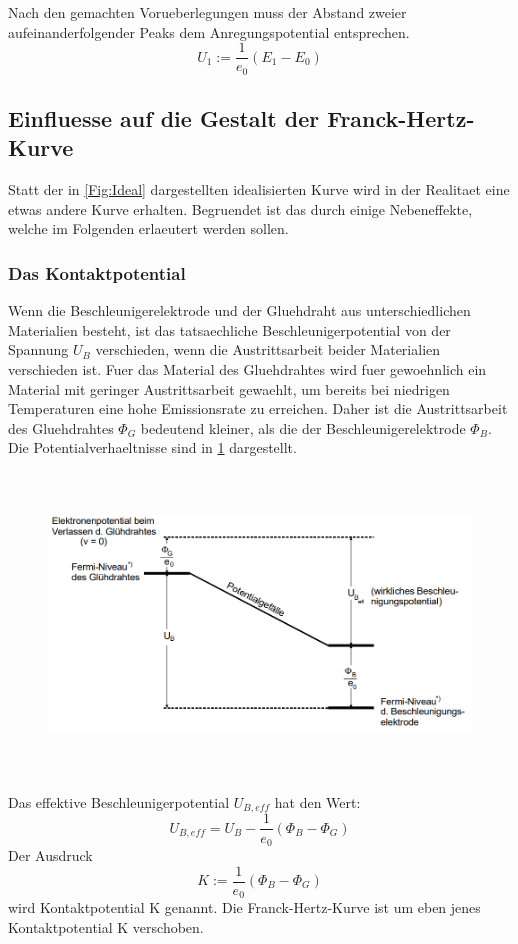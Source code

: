 Nach den gemachten Vorueberlegungen muss der Abstand zweier aufeinanderfolgender Peaks dem Anregungspotential entsprechen.
\begin{equation}
    U_1:=\frac{1}{e_0}(E_1-E_0)
\end{equation}
\subsection{Einfluesse auf die Gestalt der Franck-Hertz-Kurve}
Statt der in \ref{Fig:Ideal} dargestellten idealisierten Kurve wird in der Realitaet eine etwas andere Kurve erhalten. Begruendet ist das durch einige Nebeneffekte, welche im Folgenden erlaeutert werden sollen.
\subsubsection{Das Kontaktpotential}
Wenn die Beschleunigerelektrode und der Gluehdraht aus unterschiedlichen Materialien besteht, ist das tatsaechliche Beschleunigerpotential von der Spannung $U_B$ verschieden, wenn die Austrittsarbeit beider Materialien verschieden ist. Fuer das Material des Gluehdrahtes wird fuer gewoehnlich ein Material mit geringer Austrittsarbeit gewaehlt, um bereits bei niedrigen Temperaturen eine hohe Emissionsrate zu erreichen. Daher ist die Austrittsarbeit des Gluehdrahtes $\Phi_G$ bedeutend kleiner, als die der Beschleunigerelektrode $\Phi_B$. Die Potentialverhaeltnisse sind in \ref{Fig:Potential} dargestellt.
\begin{figure}[H]
    \centering
    \captionsetup{justification=centering}
    \includegraphics[height=8cm]{"Potential_FranckHertz.png"}
    \label{Fig:Potential}
\end{figure}
\noindent Das effektive Beschleunigerpotential $U_{B, eff}$ hat den Wert:
\begin{equation}
    U_{B,eff}=U_B-\frac{1}{e_0}(\Phi_B-\Phi_G)\nonumber
\end{equation}
Der Ausdruck 
\begin{equation}
    K:=\frac{1}{e_0}(\Phi_B-\Phi_G)\nonumber
\end{equation}
wird Kontaktpotential K genannt. Die Franck-Hertz-Kurve ist um eben jenes Kontaktpotential K verschoben.
